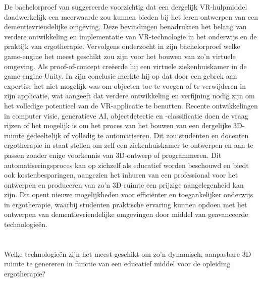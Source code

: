 De bachelorproef van \textcite{Raes2023} suggereerde voorzichtig dat een dergelijk VR-hulpmiddel daadwerkelijk een meerwaarde zou kunnen bieden bij het leren ontwerpen van een dementievriendelijke omgeving. Deze bevindingen benadrukten het belang van verdere ontwikkeling en implementatie van VR-technologie in het onderwijs en de praktijk van ergotherapie.
Vervolgens onderzocht \textcite{Neufkens2023} in zijn bachelorproef welke game-engine het meest geschikt zou zijn voor het bouwen van zo'n virtuele omgeving. Als proof-of-concept creëerde hij een virtuele ziekenhuiskamer in de game-engine Unity. In zijn conclusie merkte hij op dat door een gebrek aan expertise het niet mogelijk was om objecten toe te voegen of te verwijderen in zijn applicatie, wat aangeeft dat verdere ontwikkeling en verfijning nodig zijn om het volledige potentieel van de VR-applicatie te benutten.
Recente ontwikkelingen in computer visie, generatieve AI, objectdetectie en -classificatie doen de vraag rijzen of het mogelijk is om het proces van het bouwen van een dergelijke 3D-ruimte gedeeltelijk of volledig te automatiseren. Dit zou studenten en docenten ergotherapie in staat stellen om zelf een ziekenhuiskamer te ontwerpen en aan te passen zonder enige voorkennis van 3D-ontwerp of programmeren. Dit automatiseringsproces kan op zichzelf als educatief worden beschouwd en biedt ook kostenbesparingen, aangezien het inhuren van een professional voor het ontwerpen en produceren van zo'n 3D-ruimte een prijzige aangelegenheid kan zijn. Dit opent nieuwe mogelijkheden voor efficiënter en toegankelijker onderwijs in ergotherapie, waarbij studenten praktische ervaring kunnen opdoen met het ontwerpen van dementievriendelijke omgevingen door middel van geavanceerde technologieën.


\section{}%
\label{sec:onderzoeksvraag}


Welke technologieën zijn het meest geschikt om zo'n dynamisch, aanpasbare 3D ruimte te genereren in functie van een educatief middel voor de opleiding ergotherapie?

